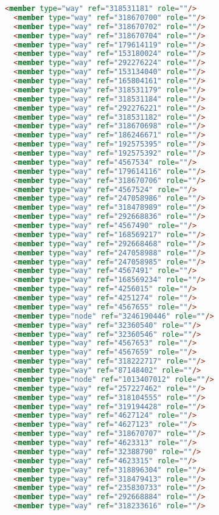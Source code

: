 \begin{lstlisting}[language=HTML,basicstyle=\tiny,caption=test.xml]
  <member type="way" ref="318531181" role=""/>
  <member type="way" ref="318670700" role=""/>
  <member type="way" ref="318670702" role=""/>
  <member type="way" ref="318670704" role=""/>
  <member type="way" ref="179614119" role=""/>
  <member type="way" ref="153180024" role=""/>
  <member type="way" ref="292276224" role=""/>
  <member type="way" ref="153134040" role=""/>
  <member type="way" ref="165804161" role=""/>
  <member type="way" ref="318531179" role=""/>
  <member type="way" ref="318531184" role=""/>
  <member type="way" ref="292276221" role=""/>
  <member type="way" ref="318531182" role=""/>
  <member type="way" ref="318670698" role=""/>
  <member type="way" ref="186246671" role=""/>
  <member type="way" ref="192575395" role=""/>
  <member type="way" ref="192575392" role=""/>
  <member type="way" ref="4567534" role=""/>
  <member type="way" ref="179614116" role=""/>
  <member type="way" ref="318670706" role=""/>
  <member type="way" ref="4567524" role=""/>
  <member type="way" ref="247058986" role=""/>
  <member type="way" ref="318478989" role=""/>
  <member type="way" ref="292668836" role=""/>
  <member type="way" ref="4567490" role=""/>
  <member type="way" ref="168569217" role=""/>
  <member type="way" ref="292668468" role=""/>
  <member type="way" ref="247058988" role=""/>
  <member type="way" ref="247058985" role=""/>
  <member type="way" ref="4567491" role=""/>
  <member type="way" ref="168569234" role=""/>
  <member type="way" ref="4256015" role=""/>
  <member type="way" ref="4251274" role=""/>
  <member type="way" ref="4567655" role=""/>
  <member type="node" ref="3246190446" role=""/>
  <member type="way" ref="32360540" role=""/>
  <member type="way" ref="32360546" role=""/>
  <member type="way" ref="4567653" role=""/>
  <member type="way" ref="4567659" role=""/>
  <member type="way" ref="318222717" role=""/>
  <member type="way" ref="87148402" role=""/>
  <member type="node" ref="1013407012" role=""/>
  <member type="way" ref="257227462" role=""/>
  <member type="way" ref="318104555" role=""/>
  <member type="way" ref="319194428" role=""/>
  <member type="way" ref="4627124" role=""/>
  <member type="way" ref="4627123" role=""/>
  <member type="way" ref="318670707" role=""/>
  <member type="way" ref="4623313" role=""/>
  <member type="way" ref="32388790" role=""/>
  <member type="way" ref="4623315" role=""/>
  <member type="way" ref="318896304" role=""/>
  <member type="way" ref="318479413" role=""/>
  <member type="way" ref="235830733" role=""/>
  <member type="way" ref="292668884" role=""/>
  <member type="way" ref="318233616" role=""/>

\end{lstlisting}
